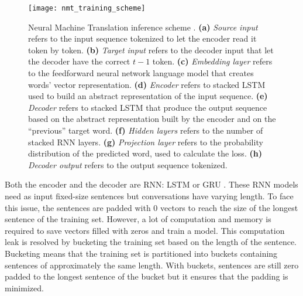 \begin{figure}
    \centering
    \texttt{[image: nmt\_training\_scheme]}
    \decoRule
    \caption[Neural Machine Translation inference scheme]{Neural Machine Translation inference scheme \citep{tensorflow.nmt}. \textbf{(a)} \textit{Source input} refers to the input sequence tokenized to let the encoder read it token by token. \textbf{(b)} \textit{Target input} refers to the decoder input that let the decoder have the correct $t-1$ token. \textbf{(c)} \textit{Embedding layer} refers to the feedforward neural network language model that creates words' vector representation. \textbf{(d)} \textit{Encoder} refers to stacked LSTM used to build an abstract representation of the input sequence. \textbf{(e)} \textit{Decoder} refers to stacked LSTM that produce the output sequence based on the abstract representation built by the encoder and on the ``previous'' target word. \textbf{(f)} \textit{Hidden layers} refers to the number of stacked RNN layers. \textbf{(g)} \textit{Projection layer} refers to the probability distribution of the predicted word, used to calculate the loss. \textbf{(h)} \textit{Decoder output} refers to the output sequence tokenized.}
    \label{fig:nmt}
\end{figure}

Both the encoder and the decoder are RNN: LSTM \citep{1409.3215,1508.04025} or GRU \citep{1706.05125,1503.02364}. These RNN models need as input fixed-size sentences but conversations have varying length. To face this issue, the sentences are padded with $0$ vectors to reach the size of the longest sentence of the training set. However, a lot of computation and memory is required to save vectors filled with zeros and train a model. This computation leak is resolved by bucketing the training set based on the length of the sentence.
Bucketing means that the training set is partitioned into buckets containing sentences of approximately the same length. With buckets, sentences are still zero padded to the longest sentence of the bucket but it ensures that the padding is minimized.



